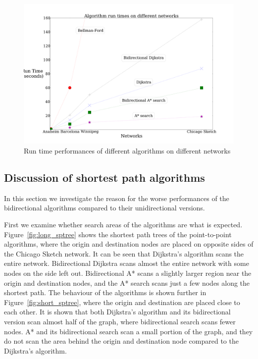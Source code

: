 \begin{figure}[!ht]
    \centering
    \includegraphics[width=\textwidth]{img/runtime}
    \caption{Run time performances of different algorithms on different networks}
    \label{fig:allresults}
\end{figure}

\subsection{Discussion of shortest path algorithms}
In this section we investigate the reason for the worse performances of the bidirectional algorithms compared to their unidirectional versions. 

First we examine whether search areas of the algorithms are what is expected.
Figure~\ref{fig:long_sptree} shows the shortest path trees of the point-to-point algorithms, 
where the origin and destination nodes are placed on opposite sides of the Chicago Sketch network.
It can be seen that Dijkstra's algorithm scans the entire network.
Bidirectional Dijkstra scans almost the entire network with some nodes on the side left out.
Bidirectional A* scans a slightly larger region near the origin and destination nodes,
and the A* search scans just a few nodes along the shortest path.
The behaviour of the algorithms is shown further in Figure~\ref{fig:short_sptree},
where the origin and destination are placed close to each other.
It is shown that both Dijkstra's algorithm and its bidirectional version scan almost half of the graph,
where bidirectional search scans fewer nodes.
A* and its bidirectional search scan a small portion of the graph,
and they do not scan the area behind the origin and destination node compared to the Dijkstra's algorithm.

